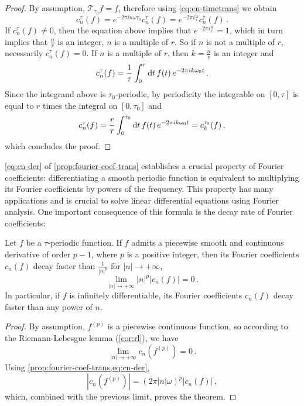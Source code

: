 \begin{proof}
  By assumption, $\mathcal{T}_{\tau_0}f=f$, therefore using \cref{eq:cn-timetrans} we
  obtain
  \begin{equation}
    c_n^\tau(f)=e^{-2\pi i n\omega \tau_0}c_n^\tau(f)=e^{-2\pi i \frac{n}{r}}c_n^\tau(f)\,.
  \end{equation}
  If $c_n^\tau(f)\neq 0$, then the equation above implies that $e^{-2\pi i
  \frac{n}{r}}=1$, which in turn implies that $\frac{n}{r}$ is an integer, \ie $n$ is a
  multiple of $r$. So if $n$ is not a multiple of $r$, necessarily $c_n^\tau(f)=0$. If $n$
  is a multiple of $r$, then $k=\frac{n}{r}$ is an integer and
  \begin{equation}
    c_n^\tau(f)=\frac{1}{\tau}\int_{0}^{\tau}\mathrm{d} t\,f(t)\,e^{-2\pi i k\omega_0 t}\,.
  \end{equation}
  Since the integrand above is $\tau_0$-periodic, by periodicity the integrable on
  $[0,\tau]$ is equal to $r$ times the integral on $[0,\tau_0]$ and
  \begin{equation}
    c_n^\tau(f)=\frac{r}{\tau}\int_{0}^{\tau_0}\mathrm{d} t\,f(t)\,
    e^{-2\pi i k\omega_0 t}=c_{k}^{\tau_0}(f)\,,
  \end{equation}
  which concludes the proof.
\end{proof}
\cref{eq:cn-der} of \cref{prop:fourier-coef-trans} establishes a crucial property of
Fourier coefficients: differentiating a smooth periodic function is equivalent to
multiplying its Fourier coefficients by powers of the frequency. This property has many
applications and is crucial to solve linear differential equations using Fourier analysis.
One important consequence of this formula is the decay rate of Fourier coefficients:
\begin{theorem}
  \label{thm:fourier-series-decay}
  Let $f$ be a $\tau$-periodic function. If $f$ admits a piecewise smooth and continuous
  derivative of order $p-1$, where $p$ is a positive integer, then its Fourier
  coefficients $c_n(f)$ decay faster than $\frac{1}{|n|^p}$ for $|n|\to+\infty$, \ie
  \begin{equation}
    \lim_{|n|\to+\infty} |n|^p|c_n(f)|=0\,.
  \end{equation}
  In particular, if $f$ is infinitely differentiable, its Fourier coefficients $c_n(f)$
  decay faster than any power of $n$.
\end{theorem}
\begin{proof}
  By assumption, $f^{(p)}$ is a piecewise continuous function, so according to the
  Riemann-Lebesgue lemma (\cref{cor:rl}), we have
  \begin{equation}
    \lim_{|n|\to+\infty} c_n(f^{(p)})=0\,.
  \end{equation}
  Using \cref{prop:fourier-coef-trans,eq:cn-der},
  \begin{equation}
    |c_n(f^{(p)})|=(2\pi |n|\omega)^p|c_n(f)|\,,
  \end{equation}
  which, combined with the previous limit, proves the theorem.
\end{proof}
